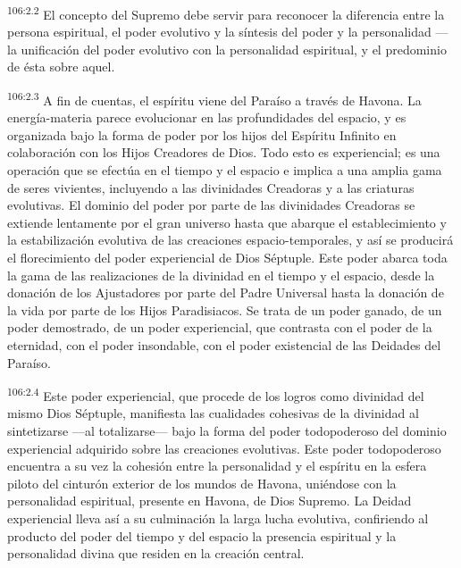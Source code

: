 \documentclass[twoside, 11pt]{book}
\begin{document}
\par
\textsuperscript{106:2.2} El concepto del Supremo debe servir para reconocer la diferencia entre la persona espiritual, el poder evolutivo y la síntesis del poder y la personalidad ---la unificación del poder evolutivo con la personalidad espiritual, y el predominio de ésta sobre aquel.

\par
\textsuperscript{106:2.3} A fin de cuentas, el espíritu viene del Paraíso a través de Havona. La energía-materia parece evolucionar en las profundidades del espacio, y es organizada bajo la forma de poder por los hijos del Espíritu Infinito en colaboración con los Hijos Creadores de Dios. Todo esto es experiencial; es una operación que se efectúa en el tiempo y el espacio e implica a una amplia gama de seres vivientes, incluyendo a las divinidades Creadoras y a las criaturas evolutivas. El dominio del poder por parte de las divinidades Creadoras se extiende lentamente por el gran universo hasta que abarque el establecimiento y la estabilización evolutiva de las creaciones espacio-temporales, y así se producirá el florecimiento del poder experiencial de Dios Séptuple. Este poder abarca toda la gama de las realizaciones de la divinidad en el tiempo y el espacio, desde la donación de los Ajustadores por parte del Padre Universal hasta la donación de la vida por parte de los Hijos Paradisiacos. Se trata de un poder ganado, de un poder demostrado, de un poder experiencial, que contrasta con el poder de la eternidad, con el poder insondable, con el poder existencial de las Deidades del Paraíso.

\par
\textsuperscript{106:2.4} Este poder experiencial, que procede de los logros como divinidad del mismo Dios Séptuple, manifiesta las cualidades cohesivas de la divinidad al sintetizarse ---al totalizarse--- bajo la forma del poder todopoderoso del dominio experiencial adquirido sobre las creaciones evolutivas. Este poder todopoderoso encuentra a su vez la cohesión entre la personalidad y el espíritu en la esfera piloto del cinturón exterior de los mundos de Havona, uniéndose con la personalidad espiritual, presente en Havona, de Dios Supremo. La Deidad experiencial lleva así a su culminación la larga lucha evolutiva, confiriendo al producto del poder del tiempo y del espacio la presencia espiritual y la personalidad divina que residen en la creación central.
\end{document}
